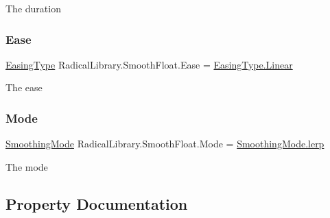 The duration 

\mbox{\label{class_radical_library_1_1_smooth_float_a0ca55cc46792c8a3b019495aa6ce2a8f}} 
\subsubsection{\texorpdfstring{Ease}{Ease}}
{\footnotesize\ttfamily \hyperlink{namespace_radical_library_a2d6877adaf2ec492cf30c572aa684e6f}{Easing\+Type} Radical\+Library.\+Smooth\+Float.\+Ease = \hyperlink{namespace_radical_library_a2d6877adaf2ec492cf30c572aa684e6fa32a843da6ea40ab3b17a3421ccdf671b}{Easing\+Type.\+Linear}}



The ease 

\mbox{\label{class_radical_library_1_1_smooth_float_a65b07f9543c0c2eb486b2220c1d8c200}} 
\subsubsection{\texorpdfstring{Mode}{Mode}}
{\footnotesize\ttfamily \hyperlink{namespace_radical_library_a53ca8c4ff40f917ad8d03bb2c0dbd548}{Smoothing\+Mode} Radical\+Library.\+Smooth\+Float.\+Mode = \hyperlink{namespace_radical_library_a53ca8c4ff40f917ad8d03bb2c0dbd548af276cc520db3c6e67c238feefa5130ab}{Smoothing\+Mode.\+lerp}}



The mode 



\subsection{Property Documentation}
\mbox{\label{class_radical_library_1_1_smooth_float_ae7f201544e383a9e177ddcc0fb17c26f}} 
